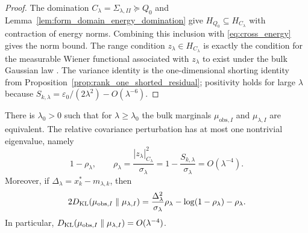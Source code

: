 \begin{proof}
The domination $C_\lambda=\Sigma_{\lambda,II}\succeq Q_0$ and
Lemma~\ref{lem:form_domain_energy_domination} give
$H_{Q_0}\subseteq H_{C_\lambda}$ with contraction of energy norms.  Combining
this inclusion with \eqref{eq:cross_energy} gives the norm bound.  The range
condition $z_\lambda\in H_{C_\lambda}$ is exactly the condition for the
measurable Wiener functional associated with $z_\lambda$ to exist under the bulk
Gaussian law \cite{bogachev1998gaussian,steinwart2024conditioning}.  The variance identity is the
one-dimensional shorting identity from Proposition~\ref{prop:rank_one_shorted_residual};
positivity holds for large $\lambda$ because
$S_{k,\lambda}=\varepsilon_0/(2\lambda^2)-O(\lambda^{-6})$.
\end{proof}

\begin{lemma}
\label{lem:feldman_hajek}
There is $\lambda_0>0$ such that for $\lambda\ge\lambda_0$ the bulk marginals
$\mu_{\mathrm{obs},I}$ and $\mu_{\lambda,I}$ are equivalent.  The relative
covariance perturbation has at most one nontrivial eigenvalue, namely
\begin{equation}
  1-\rho_\lambda,
  \qquad
  \rho_\lambda
  =
  \frac{|z_\lambda|_{C_\lambda}^2}{\sigma_\lambda}
  =
  1-\frac{S_{k,\lambda}}{\sigma_\lambda}
  =O(\lambda^{-4}).
  \label{eq:rho_lambda_rank_one}
\end{equation}
Moreover, if $\Delta_\lambda=x_k^*-m_{\lambda,k}$, then
\begin{equation}
  2D_{\operatorname{KL}}(\mu_{\mathrm{obs},I}\parallel\mu_{\lambda,I})
  =
  \frac{\Delta_\lambda^2}{\sigma_\lambda}\rho_\lambda
  -\log(1-\rho_\lambda)-\rho_\lambda.
  \label{eq:bulk_KL_rank_one}
\end{equation}
In particular,
$D_{\operatorname{KL}}(\mu_{\mathrm{obs},I}\parallel\mu_{\lambda,I})=O(\lambda^{-4})$.
\end{lemma}


